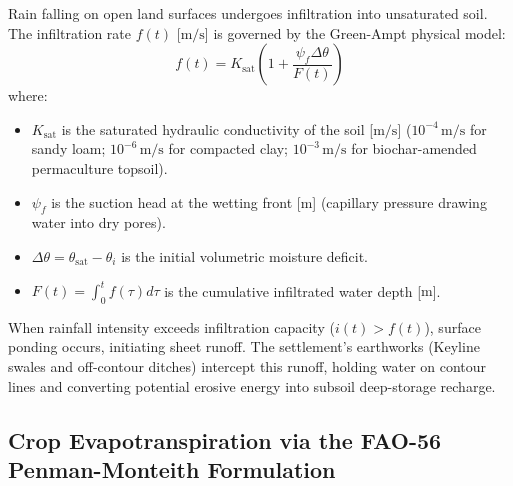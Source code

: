 Rain falling on open land surfaces undergoes infiltration into unsaturated soil. The infiltration rate $f(t)$ [$\mathrm{m/s}$] is governed by the Green-Ampt physical model:
\begin{equation}
f(t) = K_{\mathrm{sat}} \left( 1 + \frac{\psi_f \Delta\theta}{F(t)} \right)
\label{eq:green_ampt}
\end{equation}
where:
\begin{itemize}
    \item $K_{\mathrm{sat}}$ is the saturated hydraulic conductivity of the soil [$\mathrm{m/s}$] ($10^{-4}\,\mathrm{m/s}$ for sandy loam; $10^{-6}\,\mathrm{m/s}$ for compacted clay; $10^{-3}\,\mathrm{m/s}$ for biochar-amended permaculture topsoil).
    \item $\psi_f$ is the suction head at the wetting front [$\mathrm{m}$] (capillary pressure drawing water into dry pores).
    \item $\Delta\theta = \theta_{\mathrm{sat}} - \theta_i$ is the initial volumetric moisture deficit.
    \item $F(t) = \int_{0}^{t} f(\tau) d\tau$ is the cumulative infiltrated water depth [$\mathrm{m}$].
\end{itemize}

When rainfall intensity exceeds infiltration capacity ($i(t) > f(t)$), surface ponding occurs, initiating sheet runoff. The settlement's earthworks (Keyline swales and off-contour ditches) intercept this runoff, holding water on contour lines and converting potential erosive energy into subsoil deep-storage recharge.

\subsection{Crop Evapotranspiration via the FAO-56 Penman-Monteith Formulation}


